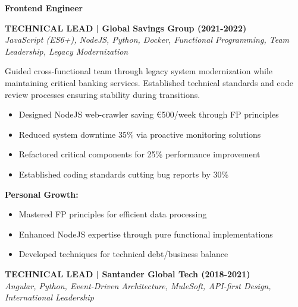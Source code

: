 \documentclass[a4paper,10pt]{article}
\begin{document}
\vspace{0.5cm}
\noindent
\begin{minipage}{\textwidth}
	{\large\bfseries\color{darkblue}\selectfont Frontend Engineer}
	\vspace{0.3cm}

	\noindent\textbf{TECHNICAL LEAD | Global Savings Group (2021-2022)} \\
	\vspace{0.1cm}
	{\small\textit{JavaScript (ES6+), NodeJS, Python, Docker, Functional Programming, Team Leadership, Legacy Modernization}}
	\vspace{0.2cm}

	Guided cross-functional team through legacy system modernization while maintaining critical banking services. Established technical standards and code review processes ensuring stability during transitions.

	\vspace{0.2cm}
	\begin{itemize}[label=\textcolor{darkblue}{\textbullet}, leftmargin=*, nosep]
		\item Designed NodeJS web-crawler saving €500/week through FP principles
		\item Reduced system downtime 35\% via proactive monitoring solutions
		\item Refactored critical components for 25\% performance improvement
		\item Established coding standards cutting bug reports by 30\%
	\end{itemize}

	\vspace{0.2cm}
	\textbf{Personal Growth:}
	\vspace{0.2cm}
	\begin{itemize}[label=\textcolor{darkblue}{\textbullet}, leftmargin=*, nosep]
		\item Mastered FP principles for efficient data processing
		\item Enhanced NodeJS expertise through pure functional implementations
		\item Developed techniques for technical debt/business balance
	\end{itemize}

	\vspace{0.4cm}

	\noindent\textbf{TECHNICAL LEAD | Santander Global Tech (2018-2021)} \\
	\vspace{0.1cm}
	{\small\textit{Angular, Python, Event-Driven Architecture, MuleSoft, API-first Design, International Leadership}}
	\vspace{0.2cm}


\end{minipage}
\end{document}
